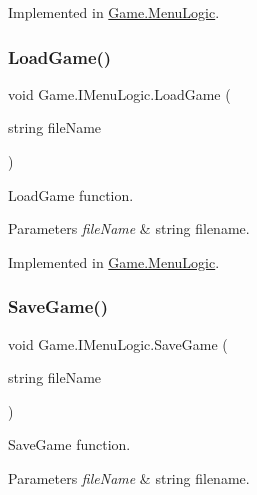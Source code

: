 Implemented in \mbox{\hyperlink{class_game_1_1_menu_logic_a615398aa76c650db2fa6a3f5fcf7e215}{Game.\+Menu\+Logic}}.

\mbox{\label{interface_game_1_1_i_menu_logic_a6a8e5c2d0407676f4f39d3fd81124aef}} 
\subsubsection{\texorpdfstring{LoadGame()}{LoadGame()}}
{\footnotesize\ttfamily void Game.\+I\+Menu\+Logic.\+Load\+Game (\begin{DoxyParamCaption}\item[{string}]{file\+Name }\end{DoxyParamCaption})}



Load\+Game function. 


\begin{DoxyParams}{Parameters}
{\em file\+Name} & string filename.\\
\hline
\end{DoxyParams}


Implemented in \mbox{\hyperlink{class_game_1_1_menu_logic_a10ee91edfc847eeb03576cf512212695}{Game.\+Menu\+Logic}}.

\mbox{\label{interface_game_1_1_i_menu_logic_a68b0eadeb8c218443f9261526b1d9d7b}} 
\subsubsection{\texorpdfstring{SaveGame()}{SaveGame()}}
{\footnotesize\ttfamily void Game.\+I\+Menu\+Logic.\+Save\+Game (\begin{DoxyParamCaption}\item[{string}]{file\+Name }\end{DoxyParamCaption})}



Save\+Game function. 


\begin{DoxyParams}{Parameters}
{\em file\+Name} & string filename.\\
\hline
\end{DoxyParams}


